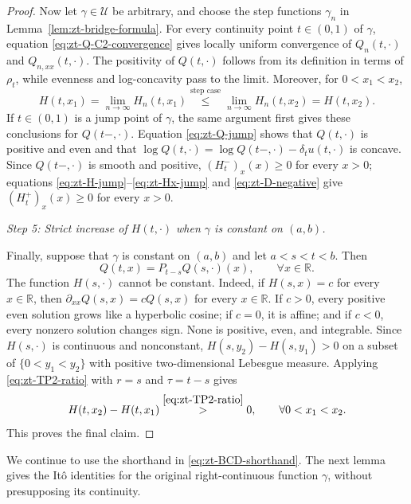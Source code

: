 \documentclass[10pt]{amsart}
\theoremstyle{definition}
\theoremstyle{remark}
\numberwithin{equation}{section}
\newcommand{\R}{\mathbb R}
\newcommand{\1}{\mathbf 1}
\newcommand{\cU}{\mathcal U}
\newcommand{\stackref}[2]{\stackrel{#2}{#1}}
\begin{document}
\begin{proof}
Now let $\gamma\in\cU$ be arbitrary, and choose the step functions $\gamma_n$ in Lemma~\ref{lem:zt-bridge-formula}. For every continuity point $t\in(0,1)$ of $\gamma$, equation \eqref{eq:zt-Q-C2-convergence} gives locally uniform convergence of $Q_n(t,\cdot)$ and $Q_{n,xx}(t,\cdot)$. The positivity of $Q(t,\cdot)$ follows from its definition in terms of $\rho_t$, while evenness and log-concavity pass to the limit. Moreover, for $0<x_1<x_2$,
\begin{equation*}
 H(t,x_1)=\lim_{n\to\infty}H_n(t,x_1)
 \stackref{\leq}{\text{step case}}
 \lim_{n\to\infty}H_n(t,x_2)=H(t,x_2).
\end{equation*}
If $t\in(0,1)$ is a jump point of $\gamma$, the same argument first gives these conclusions for $Q(t-,\cdot)$. Equation \eqref{eq:zt-Q-jump} shows that $Q(t,\cdot)$ is positive and even and that $\log Q(t,\cdot)=\log Q(t-,\cdot)-\delta_tu(t,\cdot)$ is concave. Since $Q(t-,\cdot)$ is smooth and positive, $(H_t^-)_x(x)\geq0$ for every $x>0$; equations \eqref{eq:zt-H-jump}--\eqref{eq:zt-Hx-jump} and \eqref{eq:zt-D-negative} give $(H_t^+)_x(x)\geq0$ for every $x>0$.

\smallskip
\noindent\emph{Step 5: Strict increase of $H(t,\cdot)$ when $\gamma$ is constant on $(a,b)$.}

Finally, suppose that $\gamma$ is constant on $(a,b)$ and let $a<s<t<b$. Then
\begin{equation*}
 Q(t,x)=P_{t-s}Q(s,\cdot)(x),
 \qquad \forall x\in\R.
\end{equation*}
The function $H(s,\cdot)$ cannot be constant. Indeed, if $H(s,x)=c$ for every $x\in\R$, then $\partial_{xx}Q(s,x)=cQ(s,x)$ for every $x\in\R$. If $c>0$, every positive even solution grows like a hyperbolic cosine; if $c=0$, it is affine; and if $c<0$, every nonzero solution changes sign. None is positive, even, and integrable. Since $H(s,\cdot)$ is continuous and nonconstant, $H(s,y_2)-H(s,y_1)>0$ on a subset of $\{0<y_1<y_2\}$ with positive two-dimensional Lebesgue measure. Applying \eqref{eq:zt-TP2-ratio} with $r=s$ and $\tau=t-s$ gives
\begin{equation*}
 H(t,x_2)-H(t,x_1)
 \stackref{>}{\eqref{eq:zt-TP2-ratio}}0,
 \qquad \forall 0<x_1<x_2.
\end{equation*}
This proves the final claim.
\end{proof}

We continue to use the shorthand in \eqref{eq:zt-BCD-shorthand}. The next lemma gives the It\^o identities for the original right-continuous function $\gamma$, without presupposing its continuity.
\end{document}
